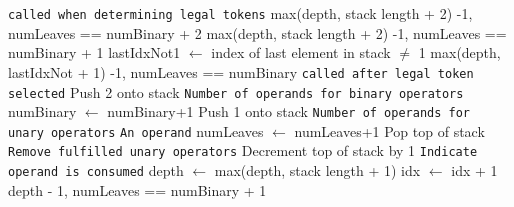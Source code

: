 \documentclass[runningheads]{llncs}
\begin{document}
\begin{algorithm}
\begin{algorithmic}[1]
     \Comment\texttt{{called when determining legal tokens}}
            \State \Return max(depth, stack length + 2) -1,  numLeaves == numBinary + 2
            \State \Return max(depth, stack length + 2) -1,  numLeaves == numBinary + 1
            \State lastIdxNot1 $\gets$ index of last element in stack $\neq$ 1
            \State \Return max(depth, lastIdxNot + 1) -1,  numLeaves == numBinary
        \EndIf
    \Else \Comment\texttt{{called after legal token selected}}
            \State Push 2 onto stack   \Comment\texttt{{Number of operands for binary operators}}
            \State numBinary $\gets$ numBinary+1
             \State Push 1 onto stack  \Comment\texttt{{Number of operands for unary operators}}
        \Else  \Comment\texttt{{An operand}}
            \State numLeaves $\gets$ numLeaves+1
                \State Pop top of stack \Comment\texttt{{Remove fulfilled unary operators}}
            \EndWhile
                \State Decrement top of stack by 1 \Comment\texttt{{Indicate operand is consumed}}
            \EndIf
        \EndIf
        \State  depth $\gets$ max(depth, stack length + 1)
        \State idx $\gets$ idx + 1
    \EndIf
    \State \Return depth - 1, numLeaves == numBinary + 1 
\EndFunction
\end{algorithmic}
\end{algorithm}
\end{document}
